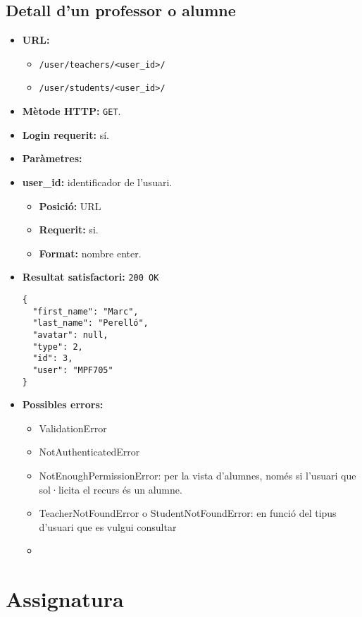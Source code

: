 \subsection{Detall d'un professor o alumne}
\begin{itemize}
\item \textbf{\ac{URL}:} 
	\begin{itemize}
		\item \texttt{/user/teachers/<user\_id>/}
		\item \texttt{/user/students/<user\_id>/}
	\end{itemize}
\item \textbf{Mètode \ac{HTTP}: } \texttt{GET}.
\item \textbf{Login requerit:} sí.
\item \textbf{Paràmetres:} 
	\item \textbf{user\_id:} identificador de l'usuari.	
		\begin{itemize}
			\item \textbf{Posició:} \ac{URL}
			\item \textbf{Requerit:} si.
			\item \textbf{Format:} nombre enter.
		\end{itemize}
	
\item \textbf{Resultat satisfactori:} \texttt{200 OK}
	\begin{verbatim}
{
  "first_name": "Marc",
  "last_name": "Perelló",
  "avatar": null,
  "type": 2,
  "id": 3,
  "user": "MPF705"
}
	\end{verbatim}
\item \textbf{Possibles errors:}
	\begin{itemize}
		\item ValidationError
		\item NotAuthenticatedError
		\item NotEnoughPermissionError: per la vista d'alumnes, només si l'usuari que sol·licita el recurs és un alumne.
		\item TeacherNotFoundError o StudentNotFoundError: en funció del tipus d'usuari que es vulgui consultar
		\item 
	\end{itemize}
\end{itemize}

\section{Assignatura}

